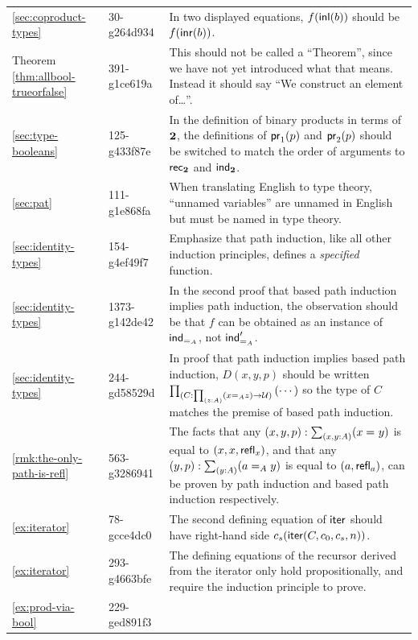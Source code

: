 \documentclass[
%
%
11pt %
]{article}
\begin{document}
\begin{longtable}{llp{10.5cm}}
  \cref{sec:coproduct-types}
  & 30-g264d934
  & In two displayed equations, $f({\mathsf{inl}}(b))$ should be $f({\mathsf{inr}}(b))$.\\
  Theorem \ref{thm:allbool-trueorfalse} %
  & 391-g1ce619a
  & This should not be called a ``Theorem'', since we have not yet introduced what that means.
  Instead it should say ``We construct an element of\dots''.\\
  \cref{sec:type-booleans}
  & 125-g433f87e
  & In the definition of binary products in terms of $\mathbf{2}$, the definitions of $\mathsf{pr}_{1}(p)$ and $\mathsf{pr}_{2}(p)$ should be switched to match the order of arguments to $\mathsf{rec}_{\mathbf{2}}$ and $\mathsf{ind}_{\mathbf{2}}$.\\
  \cref{sec:pat}
  & 111-g1e868fa
  & When translating English to type theory, ``unnamed variables'' are unnamed in English but must be named in type theory.\\
  \cref{sec:identity-types}
  & 154-g4ef49f7
  & Emphasize that path induction, like all other induction principles, defines a \emph{specified} function.\\
  \cref{sec:identity-types}
  & 1373-g142de42
  & In the second proof that based path induction implies path induction, the observation should be that $f$ can be obtained as an instance of $\mathsf{ind}_{=_{A}}$, not $\mathsf{ind}_{=_{A}}'$.\\
  \cref{sec:identity-types}
  & 244-gd58529d
  & In proof that path induction implies based path induction, $D(x,y,p)$ should be written $\prd{C : \prd{z:A} (\id[A]{x}{z}) \to \UU} \left( \cdots \right)$ so the type of $C$ matches the premise of based path induction. \\
  \cref{rmk:the-only-path-is-refl}
  & 563-g3286941
  & The facts that any $(x,y,p): \sm{x,y:A}(\id{x}{y})$ is equal to $(x,x,\mathsf{refl}_{x})$, and that any $(y,p):\sm{y:A}(\id[A]{a}{y})$ is equal to $(a,\mathsf{refl}_{a})$, can be proven by path induction and based path induction respectively.\\
  \cref{ex:iterator}
  & 78-gcce4dc0
  & The second defining equation of $\mathsf{iter}$ should have right-hand side $c_s(\mathsf{iter}(C,c_0,c_s,n))$.\\
  \cref{ex:iterator}
  & 293-g4663bfe
  & The defining equations of the recursor derived from the iterator only hold propositionally, and require the induction principle to prove.\\
  \cref{ex:prod-via-bool}
  & 229-ged891f3

\end{longtable}
\end{document}
